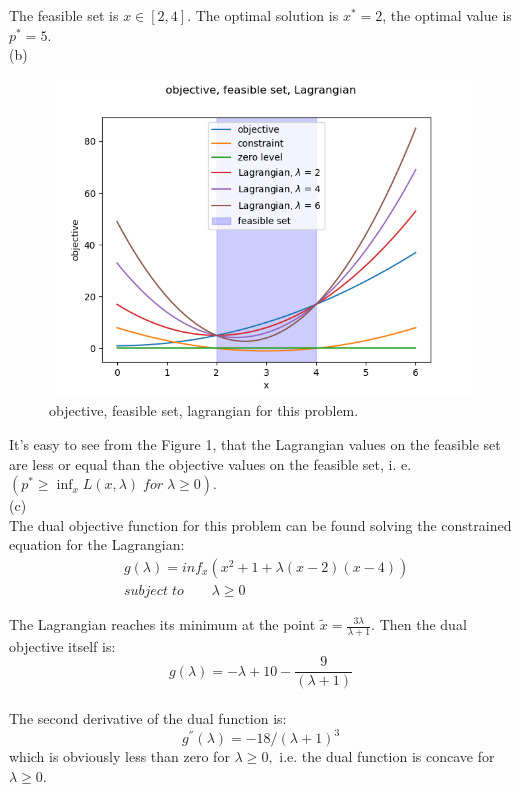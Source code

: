 \documentclass{article}
\begin{document}
The feasible set is $x \in [2, 4] $. The optimal solution is 
$x^* = 2$, the optimal value is $p^* = 5.$ \\

(b)\\
\begin{figure}[H]
	\includegraphics[width=\linewidth]{5_1_b_1.png}
	\caption{objective, feasible set, lagrangian for this problem.}
	\label{fig:5_1_b_1}
\end{figure}

It's easy to see from the Figure 1, that the Lagrangian values on the feasible set are less or equal than the objective values on the feasible set, 
i. e. \\ 
$(p^* \geq \inf_x L(x, \lambda) \;for\; \lambda \geq 0 ).$ \\

(c)\\
The dual objective function for this problem can be found solving the constrained equation for the Lagrangian: \\

\begin{align*}
&g(\lambda) = inf_{x} (x^2 + 1 + \lambda (x - 2)(x - 4))\\
&subject \; to  \qquad \lambda \geq 0
\end{align*} 

The Lagrangian reaches its minimum at the point 
$\tilde x = \frac{3 \lambda}{\lambda + 1}.$
Then the dual objective itself is: \\
$$g(\lambda) = - \lambda + 10 - \frac{9}{(\lambda + 1)}$$ \\
The second derivative of the dual function is:\\
$$g^{''}(\lambda) = - 18 / (\lambda + 1)^3$$
which is obviously less than zero for $\lambda \geq 0,$ i.e. the dual function is concave for $\lambda \geq 0.$
\end{document}
